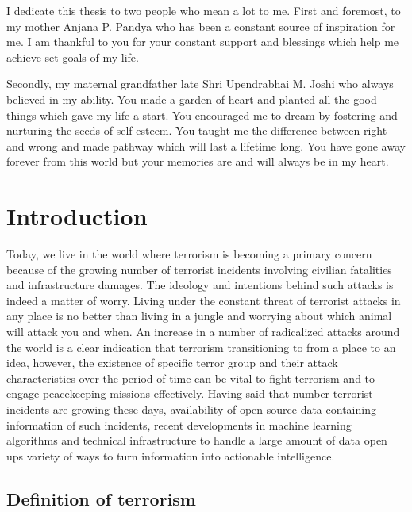 \documentclass[11pt,oneside,a4paper]{reedthesis}
\begin{document}
  \begin{dedication}
    I dedicate this thesis to two people who mean a lot to me. First and
    foremost, to my mother Anjana P. Pandya who has been a constant source
    of inspiration for me. I am thankful to you for your constant support
    and blessings which help me achieve set goals of my life.
    
    Secondly, my maternal grandfather late Shri Upendrabhai M. Joshi who
    always believed in my ability. You made a garden of heart and planted
    all the good things which gave my life a start. You encouraged me to
    dream by fostering and nurturing the seeds of self-esteem. You taught me
    the difference between right and wrong and made pathway which will last
    a lifetime long. You have gone away forever from this world but your
    memories are and will always be in my heart.
  \end{dedication}
\mainmatter %
\pagestyle{fancyplain} %
\fontsize{11}{12}\selectfont
\chapter*{Introduction}\label{introduction}

Today, we live in the world where terrorism is becoming a primary
concern because of the growing number of terrorist incidents involving
civilian fatalities and infrastructure damages. The ideology and
intentions behind such attacks is indeed a matter of worry. Living under
the constant threat of terrorist attacks in any place is no better than
living in a jungle and worrying about which animal will attack you and
when. An increase in a number of radicalized attacks around the world is
a clear indication that terrorism transitioning to from a place to an
idea, however, the existence of specific terror group and their attack
characteristics over the period of time can be vital to fight terrorism
and to engage peacekeeping missions effectively. Having said that number
terrorist incidents are growing these days, availability of open-source
data containing information of such incidents, recent developments in
machine learning algorithms and technical infrastructure to handle a
large amount of data open ups variety of ways to turn information into
actionable intelligence.

\section*{Definition of terrorism}\label{definition-of-terrorism}
\end{document}

